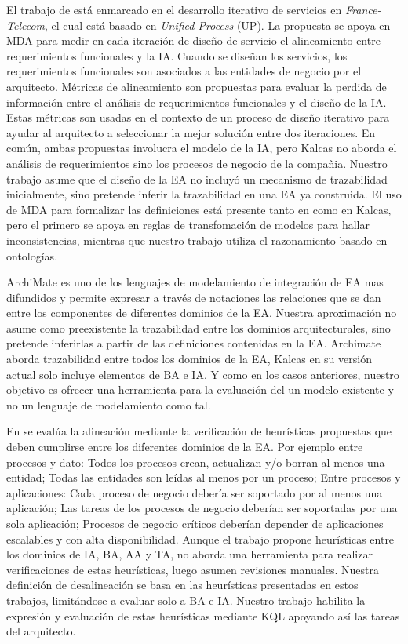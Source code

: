 El trabajo de \cite{Simonin:2007} est\'a enmarcado en el desarrollo iterativo de servicios en \textit{France-Telecom}, el cual est\'a basado en \textit{Unified Process} (UP). La propuesta se apoya en MDA para medir en cada iteraci\'on de dise\~no de servicio el alineamiento entre requerimientos funcionales y la IA. Cuando se dise\~nan los servicios, los requerimientos funcionales son asociados a las entidades de negocio por el arquitecto. M\'etricas de alineamiento son propuestas para evaluar la perdida de informaci\'on entre el an\'alisis de requerimientos funcionales y el dise\~no de la IA. Estas m\'etricas son usadas en el contexto de un proceso de dise\~no iterativo para ayudar al arquitecto a seleccionar la mejor soluci\'on entre dos iteraciones. En com\'un, ambas propuestas involucra el modelo de la IA, pero Kalcas no aborda el an\'alisis de requerimientos sino los procesos de negocio de la compa\~nia. Nuestro trabajo asume que el dise\~no de la EA no incluy\'o un mecanismo de trazabilidad inicialmente, sino pretende inferir la trazabilidad en una EA ya construida. El uso de MDA para formalizar las definiciones est\'a presente tanto en \cite{Simonin:2007} como en Kalcas, pero el primero se apoya en reglas de transfomaci\'on de modelos para hallar inconsistencias, mientras que nuestro trabajo utiliza el razonamiento basado en ontolog\'ias. 

ArchiMate \cite{Jonkers:2004} es uno de los lenguajes de modelamiento de integraci\'on de EA mas difundidos y permite expresar a trav\'es de notaciones las relaciones que se dan entre los componentes de diferentes dominios de la EA. Nuestra aproximaci\'on no asume como preexistente la trazabilidad entre los dominios arquitecturales, sino pretende inferirlas a partir de las definiciones contenidas en la EA. Archimate aborda trazabilidad entre todos los dominios de la EA, Kalcas en su versi\'on actual solo incluye elementos de BA e IA. Y como en los casos anteriores, nuestro objetivo es ofrecer una herramienta para la evaluaci\'on del un modelo existente y no un lenguaje de modelamiento como tal.

En \cite{Pereira:2003, Pereira:2005, Sousa:2005} se eval\'ua la alineaci\'on mediante la verificaci\'on de heur\'isticas propuestas que deben cumplirse entre los diferentes dominios de la EA. Por ejemplo entre procesos y dato: Todos los procesos crean, actualizan y/o borran al menos una entidad; Todas las entidades son le\'idas al menos por un proceso; Entre procesos y aplicaciones: Cada proceso de negocio deber\'ia ser soportado por al menos una aplicaci\'on; Las tareas de los procesos de negocio deber\'ian ser soportadas por una sola aplicaci\'on; Procesos de negocio cr\'iticos deber\'ian depender de aplicaciones escalables y con alta disponibilidad. Aunque el trabajo propone heur\'isticas entre los dominios de IA, BA, AA y TA, no aborda una herramienta para realizar verificaciones de estas heur\'isticas, luego asumen revisiones manuales. Nuestra definici\'on de desalineaci\'on se basa en las heur\'isticas presentadas en estos trabajos, limit\'andose a evaluar solo a BA e IA. Nuestro trabajo habilita la expresi\'on y evaluaci\'on de estas heur\'isticas mediante KQL apoyando as\'i las tareas del arquitecto.

